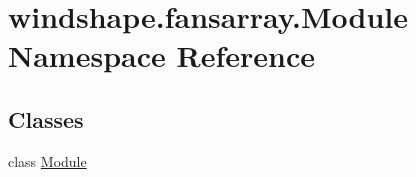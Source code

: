 \hypertarget{namespacewindshape_1_1fansarray_1_1_module}{}\section{windshape.\+fansarray.\+Module Namespace Reference}
\label{namespacewindshape_1_1fansarray_1_1_module}
\subsection*{Classes}
\begin{DoxyCompactItemize}
\item 
class \mbox{\hyperlink{classwindshape_1_1fansarray_1_1_module_1_1_module}{Module}}
\end{DoxyCompactItemize}
